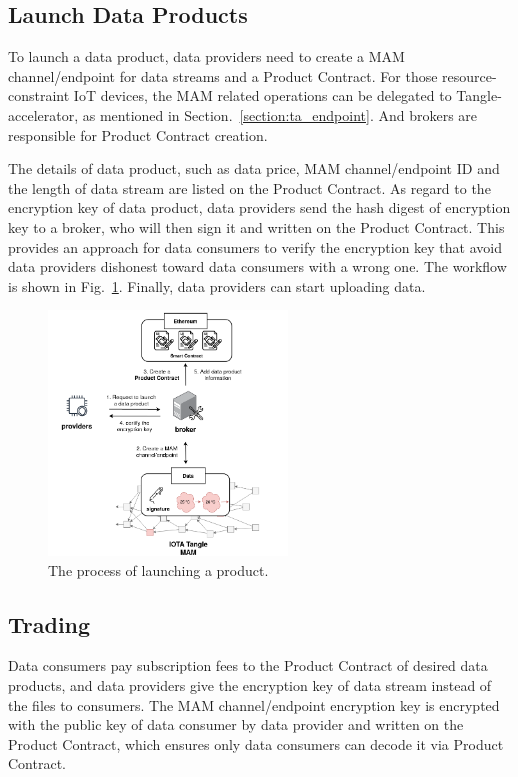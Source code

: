 \documentclass[conference]{IEEEtran}
\begin{document}
\subsection{Launch Data Products}
To launch a data product, data providers need to create a MAM channel/endpoint for data streams and a Product Contract. For those resource-constraint IoT devices, the MAM related operations can be delegated to Tangle-accelerator, as mentioned in Section.~\ref{section:ta_endpoint}. And brokers are responsible for Product Contract creation. 

The details of data product, such as data price, MAM channel/endpoint ID and the length of data stream are listed on the Product Contract. As regard to the encryption key of data product, data providers send the hash digest of encryption key to a broker, who will then sign it and written on the Product Contract. This provides an approach for data consumers to verify the encryption key that avoid data providers dishonest toward data consumers with a wrong one. The workflow is shown in Fig.~\ref{fig:launching_product}. Finally, data providers can start uploading data.
 
\begin{figure}[!t]
    \centering
    \includegraphics[width=2.5in]{launching_product}
    \caption{The process of launching a product.}
    \label{fig:launching_product}
\end{figure}

\subsection{Trading}
Data consumers pay subscription fees to the Product Contract of desired data products, and data providers give the encryption key of data stream instead of the files to consumers. The MAM channel/endpoint encryption key is encrypted with the public key of data consumer by data provider and written on the Product Contract, which ensures only data consumers can decode it via Product Contract.
\end{document}
